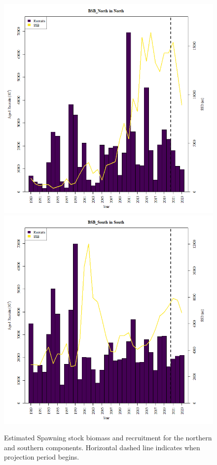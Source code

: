 \documentclass[
]{article}
\begin{document}
\begin{figure}

{\centering \includegraphics[width=0.65\linewidth]{../2023.RT.Runs/Run34/projections/plots_png/results/SSB_Rec_time_BSB_North} \includegraphics[width=0.65\linewidth]{../2023.RT.Runs/Run34/projections/plots_png/results/SSB_Rec_time_BSB_South} 

}

\caption{Estimated Spawning stock biomass and recruitment for the northern and southern components. Horizontal dashed line indicates when projection period begins.}\label{fig:SSB-R-time-proj}
\end{figure}
\end{document}
